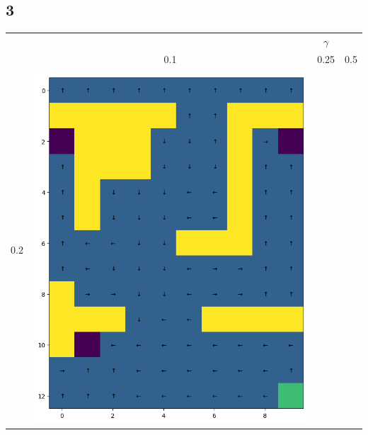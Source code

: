 \documentclass[12pt,a4paper]{report}
\begin{document}
\begin{landscape}
\subsection*{3}
\begin{center}
    \begin{tabular}{c || c  c  c}
        & & $\gamma$ & \\
        & 0.1 & 0.25 & 0.5 \\
        \hline \hline \\
        0.2 & 
            \includegraphics[width=0.35\textheight]{assets/dp/analysis/prob_0.1_gamma_0.2_policy.png}
        & 

\end{tabular}
\end{center}
\end{landscape}
\end{document}
